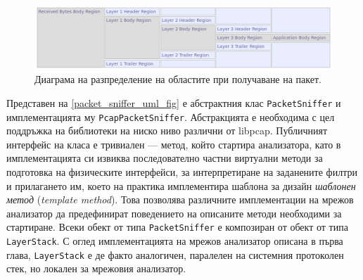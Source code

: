 \documentclass[12pt,a4paper,oneside]{book}
\begin{document}
\begin{figure}[h!]
  \centering
  \includegraphics[width=\textwidth]{figures/sniffed_packet_regions.png}
  \caption{Диаграма на разпределение на областите при получаване на пакет.}
  \label{sniffed_packet_regions_fig}
\end{figure}

Представен на \autoref{packet_sniffer_uml_fig} е абстрактния клас
\texttt{PacketSniffer} и имплементацията му \texttt{PcapPacketSniffer}.
Абстракцията е необходима с цел поддръжка на библиотеки на ниско ниво различни
от libpcap.  Публичният интерфейс на класа е тривиален --- метод,
който стартира анализатора, като в имплементацията си извиква последователно
частни виртуални методи за подготовка на физическите интерфейси, за
интерпретиране на заданените филтри и прилагането им, което на практика
имплементира шаблона за дизайн \textit{шаблонен метод} (\textit{template method}).
\cite{gamma_design_1995} Това позволява
различните имплементации на мрежов анализатор да предефинират поведението на
описаните методи необходими за стартиране.
Всеки обект от типа \texttt{PacketSniffer} е композиран от обект от типа
\texttt{LayerStack}. С оглед имплементацията на мрежов анализатор описана в
първа глава, \texttt{LayerStack} е де факто аналогичен, паралелен на системния
протоколен стек, но локален за мрежовия анализатор.
\end{document}
